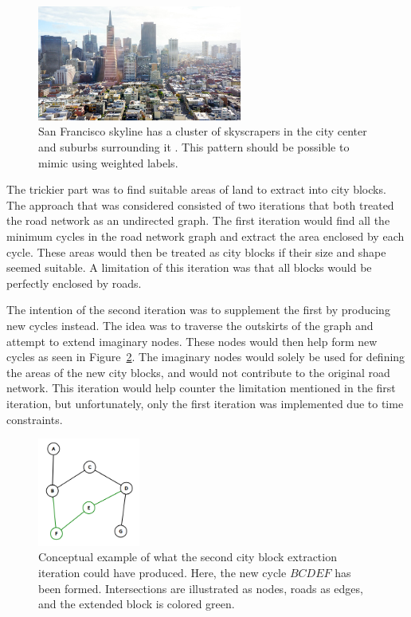 \begin{figure}[h!]
  \centering
  \includegraphics[width=0.6\textwidth]{figure/san_francisco.jpg}

  \caption{San Francisco skyline has a cluster of skyscrapers in the city center  and suburbs surrounding it \cite{san_francisco_img}. This pattern should be possible to mimic using weighted labels.}
  \label{fig:san_francisco}
\end{figure}

The trickier part was to find suitable areas of land to extract into city blocks.
The approach that was considered consisted of two iterations that both treated the road network as an undirected graph.
The first iteration would find all the minimum cycles in the road network graph and extract the area enclosed by each cycle.
These areas would then be treated as city blocks if their size and shape seemed suitable.
A limitation of this iteration was that all blocks would be perfectly enclosed by roads.

The intention of the second iteration was to supplement the first by producing new cycles instead.
The idea was to traverse the outskirts of the graph and attempt to extend imaginary nodes.
These nodes would then help form new cycles as seen in Figure~\ref{fig:extend_block}.
The imaginary nodes would solely be used for defining the areas of the new city blocks, and would not contribute to the original road network.
This iteration would help counter the limitation mentioned in the first iteration, but unfortunately, only the first iteration was implemented due to time constraints.

\begin{figure}[h!]
  \centering
  \includegraphics[width=0.3\textwidth]{figure/extend_block.png}

  \caption{Conceptual example of what the second city block extraction iteration could have produced. Here, the new cycle $BCDEF$ has been formed. Intersections are illustrated as nodes, roads as edges, and the extended block is colored green.}
  \label{fig:extend_block}
\end{figure}

